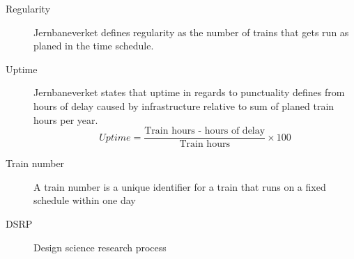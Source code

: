 \label{sec:abbriv}
\vspace{5mm}

\begin{description}
\item [Regularity]	Jernbaneverket defines regularity as the number of trains that gets run as planed in the time schedule. 
\item [Uptime]	Jernbaneverket states that uptime in regards to punctuality defines from hours of delay caused by infrastructure relative to sum of planed train hours per year. \begin{equation} Uptime =
\frac{\text{Train hours - hours of delay}}{\text{Train hours}}\times 100 \end{equation}
\item [Train number] A train number is a unique identifier for a train that 
runs on a fixed schedule within one day
\item [DSRP] Design science research process
\end{description}


